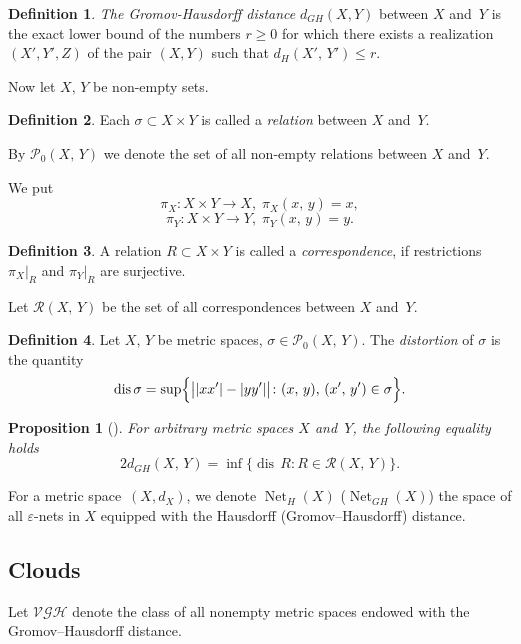 \documentclass{article}
\newtheorem{proposition}{Proposition}[]
\theoremstyle{definition}
\newtheorem{definition}{Definition}[]
\theoremstyle{plain}
\newcommand{\dis}{\operatorname{dis}}
\renewcommand{\:}{\colon}
\newcommand{\0}{\emptyset}
\renewcommand{\(}{\rom(}
\renewcommand{\)}{\rom)}
\newcommand{\nets}{\operatorname{Net}}
\begin{document}
\begin{definition} \emph{The Gromov-Hausdorff distance} $d_{GH} (X, Y)$ between $X$ and~$Y$ is the exact lower bound of the numbers $r\ge 0$ for which there exists a realization $(X', Y', Z)$ of the pair $(X, Y)$ such that $d_H(X',\,Y') \le r$. 
\end{definition}


Now let $X,\,Y$ be non-empty sets.  

\begin{definition} Each $\sigma\subset X\times Y$ is called a \textit{relation} between $X$ and~$Y$.
\end{definition}

By $\mathcal{P}_0(X,\,Y)$ we denote the set of all non-empty relations between $X$ and~$Y$.

We put $$\pi_X\colon X\times Y\rightarrow X,\;\pi_X(x,\,y) = x,$$ $$\pi_Y\colon X\times Y\rightarrow Y,\;\pi_Y(x,\,y) = y.$$ 

\begin{definition} A relation $R\subset X\times Y$ is called a \textit{correspondence}, if restrictions $\pi_X|_R$ and $\pi_Y|_R$ are surjective.
\end{definition}

Let $\mathcal{R}(X,\,Y)$ be the set of all correspondences between $X$ and~$Y$.

\begin{definition} Let $X,\,Y$ be metric spaces, $\sigma \in \mathcal{P}_0(X,\,Y)$. The \textit{distortion} of $\sigma$ is the quantity $$\dis \sigma = \sup\Bigl\{\bigl||xx'|-|yy'|\bigr|\colon(x,\,y),\,(x',\,y')\in\sigma\Bigr\}.$$
\end{definition}

\begin{proposition}[\cite{BBI}]  \label{proposition: distGHformula}
For arbitrary metric spaces $X$ and~$Y$, the following equality holds $$2d_{GH}(X,\,Y) = \inf\bigl\{\dis\,R\colon R\in\mathcal{R}(X,\,Y)\bigr\}.$$
\end{proposition}

For a metric space~$(X, d_X)$, we denote $\nets_H(X)$ ($\nets_{GH}(X)$) the space of all $\varepsilon$-nets in $X$ equipped with the Hausdorff (Gromov--Hausdorff) distance.

\subsection{Clouds}

Let $\mathcal{VGH}$ denote the class of all nonempty metric spaces endowed with the Gromov--Hausdorff distance.  
\end{document}
